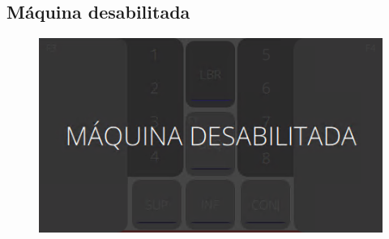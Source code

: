 \thispagestyle{fancy}
\vspace{\fill}

\subsection{\small Máquina desabilitada}
\begin{figure}
    \centering
    \includegraphics{src/imagesICV/12-KTP400-scout/e-1.png}
\end{figure}
